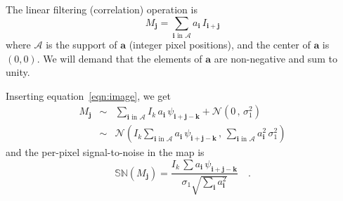 \documentclass[11pt,letterpaper,linenumbers]{aastex63}
\newcommand{\equationname}{equation}
\newcommand{\eqnref}[1]{\mbox{\equationname~\ref{#1}}}
\newcommand{\drawnfrom}{\sim}
\newcommand{\gaussianN}{\mathcal{N}}
\newcommand{\gaussx}[2]{\gaussianN\!\left(#1 \, , \, #2\right)}
\newcommand{\psf}{\psi}
\newcommand{\psfat}[1]{\psf_{#1}}
\newcommand{\signoise}{[S/N]}
\newcommand{\snr}[1]{\mathbb{SN}(#1)}
\renewcommand{\vec}[1]{\boldsymbol{#1}}
\newcommand{\avec}{\vec{a}}
\newcommand{\ivec}{\vec{i}}
\newcommand{\jvec}{\vec{j}}
\newcommand{\kvec}{\vec{k}}
\newcommand{\coord}[2]{(#1, #2)}
\newcommand{\iina}{\ivec \,\, \mathrm{in} \,\, \mathcal{A}}
\begin{document}
The linear filtering (correlation) operation is
\begin{equation}
M_{\jvec} = \sum_{\iina} a_{\ivec} \, I_{\ivec + \jvec}
\label{eq:detmap1}
\end{equation}
where $\mathcal{A}$ is the support of $\avec$ (integer pixel
positions), and the center of $\avec$ is $\coord{0}{0}$.  We will
demand that the elements of $\avec$ are non-negative and sum to unity.

Inserting \eqnref{eqn:image}, we get
\begin{eqnarray}
M_{\jvec} &\drawnfrom& \sum_{\iina}
  I_k \, a_{\ivec} \, \psfat{\ivec + \jvec - \kvec} + \gaussx{0}{\sigma_1^2}
  \\
&\drawnfrom& \gaussx{ I_k \sum_{\iina} a_{\ivec} \, \psfat{\ivec + \jvec - \kvec}}%
    {\sum_{\iina} a_{\ivec}^2 \, \sigma_1^2}
\end{eqnarray}
and the per-pixel signal-to-noise in the map is
\begin{equation}
  \snr{M_{\jvec}} = \frac{I_k \, \sum a_{\ivec} \, \psfat{\ivec + \jvec - \kvec}}{\sigma_1 \sqrt{\sum_{\ivec} a_{\ivec}^2}} \quad .
  \label{eq:detmapsn1}
\end{equation}
\end{document}
